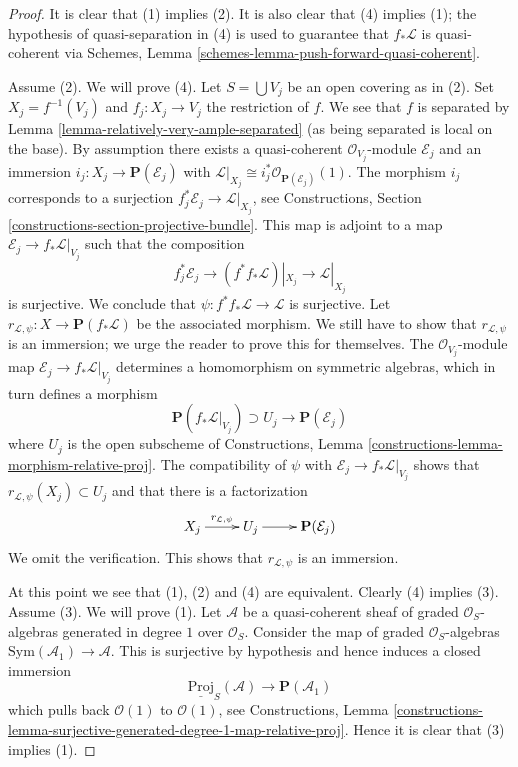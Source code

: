 \documentclass[10pt,a4paper]{amsart}
\theoremstyle{plain}
\theoremstyle{definition}
\theoremstyle{remark}
\numberwithin{equation}{subsection}
\begin{document}
\begin{proof}
It is clear that (1) implies (2). It is also clear that
(4) implies (1); the hypothesis of quasi-separation
in (4) is used to guarantee that $f_*\mathcal{L}$ is quasi-coherent via
Schemes, Lemma \ref{schemes-lemma-push-forward-quasi-coherent}.

\medskip\noindent
Assume (2). We will prove (4).
Let $S = \bigcup V_j$ be an open covering as in (2).
Set $X_j = f^{-1}(V_j)$ and $f_j : X_j \to V_j$ the
restriction of $f$. We see that $f$ is separated by
Lemma \ref{lemma-relatively-very-ample-separated} (as being
separated is local on the base). By assumption there exists a
quasi-coherent $\mathcal{O}_{V_j}$-module $\mathcal{E}_j$ and an immersion
$i_j : X_j \to \mathbf{P}(\mathcal{E}_j)$ with
$\mathcal{L}|_{X_j} \cong i_j^*\mathcal{O}_{\mathbf{P}(\mathcal{E}_j)}(1)$.
The morphism $i_j$ corresponds to a surjection
$f_j^*\mathcal{E}_j \to \mathcal{L}|_{X_j}$, see
Constructions, Section \ref{constructions-section-projective-bundle}.
This map is adjoint to a map $\mathcal{E}_j \to f_*\mathcal{L}|_{V_j}$
such that the composition
$$
f_j^*\mathcal{E}_j \to (f^*f_*\mathcal{L})|_{X_j} \to \mathcal{L}|_{X_j}
$$
is surjective. We conclude that
$\psi : f^*f_*\mathcal{L} \to \mathcal{L}$ is surjective. Let
$r_{\mathcal{L}, \psi} : X \to \mathbf{P}(f_*\mathcal{L})$ be the
associated morphism. We still have to show that $r_{\mathcal{L}, \psi}$
is an immersion; we urge the reader to prove this for themselves.
The $\mathcal{O}_{V_j}$-module map $\mathcal{E}_j \to f_*\mathcal{L}|_{V_j}$
determines a homomorphism on symmetric algebras, which in turn defines a
morphism
$$
\mathbf{P}(f_*\mathcal{L}|_{V_j}) \supset U_j \longrightarrow
\mathbf{P}(\mathcal{E}_j)
$$
where $U_j$ is the open subscheme of
Constructions, Lemma \ref{constructions-lemma-morphism-relative-proj}.
The compatibility of $\psi$ with $\mathcal{E}_j \to f_*\mathcal{L}|_{V_j}$
shows that $r_{\mathcal{L}, \psi}(X_j) \subset U_j$ and that there is a
factorization
$$
\xymatrix{
X_j \ar[r]^-{r_{\mathcal{L}, \psi}} & U_j \ar[r] &
\mathbf{P}(\mathcal{E}_j)
}
$$
We omit the verification.
This shows that $r_{\mathcal{L}, \psi}$ is an immersion.

\medskip\noindent
At this point we see that (1), (2) and (4) are equivalent.
Clearly (4) implies (3). Assume (3). We will prove (1).
Let $\mathcal{A}$ be a quasi-coherent sheaf of graded $\mathcal{O}_S$-algebras
generated in degree $1$ over $\mathcal{O}_S$. Consider the map of
graded $\mathcal{O}_S$-algebras $\text{Sym}(\mathcal{A}_1) \to \mathcal{A}$.
This is surjective by hypothesis and hence induces a closed immersion
$$
\underline{\text{Proj}}_S(\mathcal{A})
\longrightarrow
\mathbf{P}(\mathcal{A}_1)
$$
which pulls back $\mathcal{O}(1)$ to $\mathcal{O}(1)$,
see Constructions, Lemma
\ref{constructions-lemma-surjective-generated-degree-1-map-relative-proj}.
Hence it is clear that (3) implies (1).
\end{proof}
\end{document}
